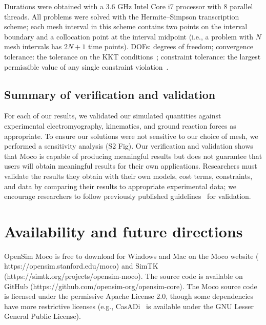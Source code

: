 \documentclass[10pt,letterpaper]{article}
\begin{document}
\begin{table}[!ht]
\begin{adjustwidth}{-2.25in}{0in}
        \begin{flushleft}
            Durations were obtained with a
            3.6 GHz Intel Core i7 processor with 8 parallel threads.
            All problems were solved with the Hermite--Simpson transcription scheme;
            each mesh interval in this scheme contains two points on the interval boundary
            and a collocation point at the interval midpoint (i.e., a problem with $N$ mesh intervals has $2N + 1$ time points). DOFs: degrees of freedom;
convergence tolerance: the tolerance on the KKT conditions~\cite{Betts:2010}; constraint tolerance: the largest permissible value of any single constraint violation~\cite{Wachter:2006}.
        \end{flushleft}
        \label{tab:durations}
    \end{adjustwidth}
\end{table}

\subsection*{Summary of verification and validation}

For each of our results, we validated our simulated quantities against experimental electromyography, kinematics, and ground reaction forces as appropriate. To ensure our solutions were not sensitive to our choice of mesh, we performed a sensitivity analysis (S2 Fig). Our verification and validation shows that Moco is capable of producing meaningful results but does not guarantee that users will obtain meaningful results for their own applications. Researchers must validate the results they obtain with their own models, cost terms, constraints, and data by comparing their results to appropriate experimental data; we encourage researchers to follow previously published guidelines~\cite{Hicks:2015bo} for validation.

\section*{Availability and future directions}

OpenSim Moco is free to download for Windows and Mac on the Moco website (\\https://opensim.stanford.edu/moco) and SimTK (https://simtk.org/projects/opensim-moco). The source code is available on GitHub (https://github.com/opensim-org/opensim-core). The Moco source code is licensed under the permissive Apache License 2.0, though some dependencies have more restrictive licenses (e.g., CasADi~\cite{Andersson:2019} is available under the GNU Lesser General Public License).
\end{document}
